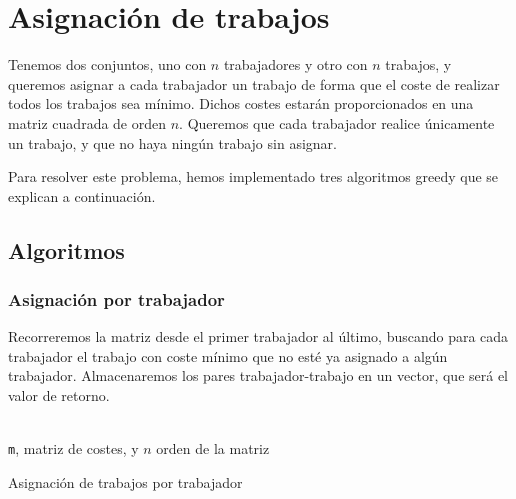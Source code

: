 \documentclass[a4paper, 11pt]{article} %
\begin{document}
\section{Asignación de trabajos}
Tenemos dos conjuntos, uno con $n$ trabajadores y otro con $n$ trabajos, y queremos asignar a cada trabajador un trabajo de forma
que el coste de realizar todos los trabajos sea mínimo. Dichos costes estarán proporcionados en una matriz cuadrada
de orden $n$. Queremos que cada trabajador realice únicamente un trabajo, y que no haya ningún trabajo sin asignar. 

Para resolver este problema, hemos implementado tres algoritmos greedy que se explican a continuación. 
	\subsection{Algoritmos}
		\subsubsection{Asignación por trabajador}
		Recorreremos la matriz desde el primer trabajador al último, buscando para cada trabajador el trabajo con coste mínimo que no esté ya asignado a algún trabajador. Almacenaremos los pares trabajador-trabajo en un vector, que será el valor de retorno. 
		
		\begin{algorithm}[H]
			\begin{algorithmic}[1]
				\REQUIRE \ \\
					\texttt{m}, matriz de costes, y $n$ orden de la matriz\\
		            	\ENDIF
		            \ENDIF
		          \ENDFOR
		        \ENDFOR  	
		        
			\end{algorithmic}
		    \caption{Asignación de trabajos por trabajador}
		    \label{Asignación Trabajos}
		\end{algorithm}
		
\end{document}
